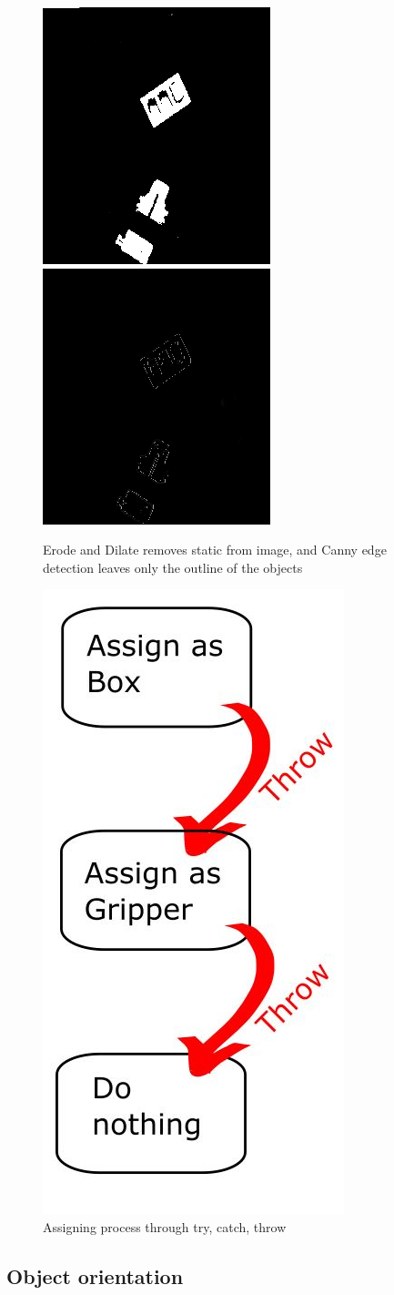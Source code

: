 \documentclass[11pt,a4paper, margin=1in]{report}
\begin{document}
\begin{figure}[h]
	\centering
	\includegraphics[width=0.3\linewidth]{out4} %
	\includegraphics[width=0.3\linewidth]{out3}
	\caption{Erode and Dilate removes static from image, and Canny edge detection leaves only the outline of the objects }
	\label{fig:out4}
\end{figure}
\begin{figure}[h]
	\centering
	\includegraphics[width=0.2\linewidth]{Throwlinek}
	\caption{Assigning process through try, catch, throw}
	\label{fig:Throwlinek}
\end{figure}

\FloatBarrier
\subsection{Object orientation}
\end{document}
